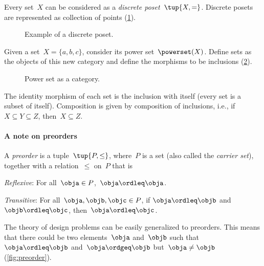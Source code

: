 \begin{example}
\label{ex:discreteposet}
Every set~$X$ can be considered as a \emph{discrete poset}~$\tup{X,=}$. Discrete posets are represented as collection of points (\cref{fig:discretepos}).

\begin{figure}[tbh]
   \centering
   \caption{Example of a discrete poset. \label{fig:discretepos}}
\end{figure}

\begin{example}
\label{ex:hasseinclusion}
Given a set~$X=\{a,b,c\}$, consider its power set~$\powerset(X)$. Define sets as the objects of this new category and define the morphisms to be inclusions (\cref{fig:powersetcat}).

\begin{figure}[h!]
\begin{center}
\end{center}
\caption{Power set as a category. \label{fig:powersetcat}}
\end{figure}

The identity morphism of each set is the inclusion with itself (every set is a subset of itself). Composition is given by composition of inclusions, i.e., if~$X\subseteq Y \subseteq Z$, then~$X\subseteq Z$. 
\end{example}
\end{example}

\paragraph{A note on preorders}
\begin{definition}[Preorder]
\label{def:preorder}
A \emph{preorder} is a tuple~$\tup{P, \leq}$,
where~$P$ is a set (also called the \emph{carrier set}), together with a
relation~$\leq$ on~$P$ that is
\begin{compactenum}
    \item \emph{Reflexive}: For all~$\obja\in P$,~$\obja\ordleq \obja$.
    \item \emph{Transitive}: For all~$\obja,\objb,\objc\in P$, if $\obja\ordleq \objb$ and~$\objb\ordleq \objc$, then~$\obja\ordleq \objc$.
\end{compactenum}
\end{definition}
The theory of design problems can be easily generalized to preorders. This means that there could be two elements~$\obja$ and~$\objb$ such that~$\obja\ordleq \objb$ and~$\obja \ordgeq \objb$ but~$\obja \neq \objb$ (\cref{fig:preorder}).

